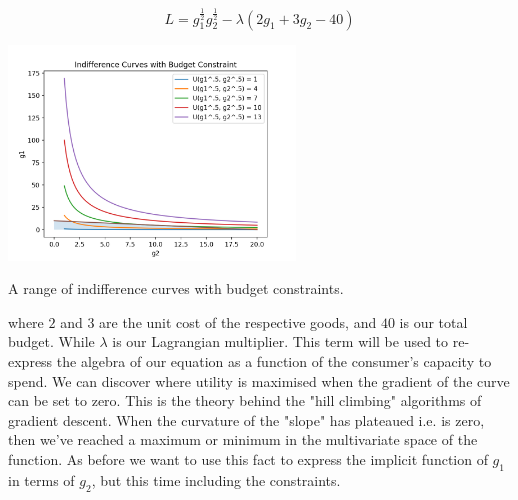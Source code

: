 \documentclass{tufte-handout}
\begin{document}
$$ L = g_{1}^{\frac{1}{2}}g_{2}^{\frac{1}{2}} - \lambda(2g_{1} + 3g_{2} - 40) $$


\begin{marginfigure}
\includegraphics[width=3in, height=5.in]{Plots/indifference_curves_budget.png}
\caption{A range of indifference curves with budget constraints.}
\end{marginfigure}

\noindent where $2$ and $3$ are the unit cost of the respective goods, and $40$ is our total budget. While $\lambda$ is our Lagrangian multiplier. This term will be used to re-express the algebra of our equation as a function of the consumer's capacity to spend. We can discover where utility is maximised when the gradient of the curve can be set to zero. This is the theory behind the "hill climbing" algorithms of gradient descent. When the curvature of the "slope" has plateaued i.e. is zero, then we've reached a maximum or minimum in the multivariate space of the function. As before we want to use this fact to express the implicit function of $g_{1}$ in terms of $g_{2}$, but this time including the constraints.
\end{document}
